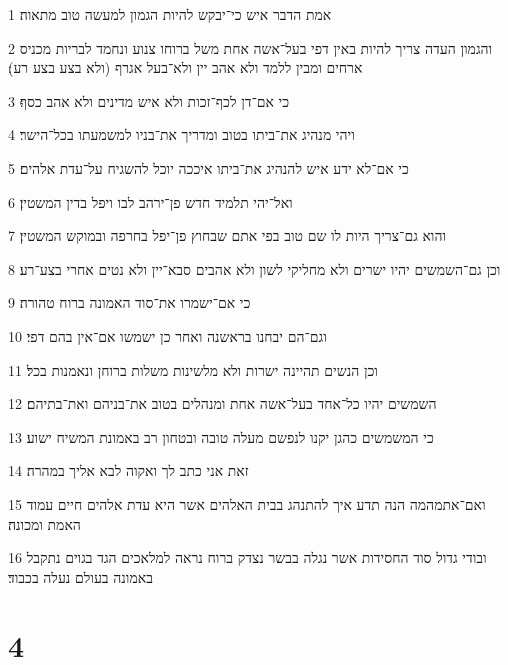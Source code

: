 \par 1 אמת הדבר איש כי־יבקש להיות הגמון למעשה טוב מתאוה׃
\par 2 והגמון העדה צריך להיות באין דפי בעל־אשה אחת משל ברוחו צנוע ונחמד לבריות מכניס ארחים ומבין ללמד ולא אהב יין ולא־בעל אגרף (ולא בצע בצע רע)׃
\par 3 כי אם־דן לכף־זכות ולא איש מדינים ולא אהב כסף׃
\par 4 ויהי מנהיג את־ביתו בטוב ומדריך את־בניו למשמעתו בכל־הישר׃
\par 5 כי אם־לא ידע איש להנהיג את־ביתו איככה יוכל להשגיח על־עדת אלהים׃
\par 6 ואל־יהי תלמיד חדש פן־ירהב לבו ויפל בדין המשטין׃
\par 7 והוא גם־צריך היות לו שם טוב בפי אתם שבחוץ פן־יפל בחרפה ובמוקש המשטין׃
\par 8 וכן גם־השמשים יהיו ישרים ולא מחליקי לשון ולא אהבים סבא־יין ולא נטים אחרי בצע־רע׃
\par 9 כי אם־ישמרו את־סוד האמונה ברוח טהורה׃
\par 10 וגם־הם יבחנו בראשנה ואחר כן ישמשו אם־אין בהם דפי׃
\par 11 וכן הנשים תהיינה ישרות ולא מלשינות משלות ברוחן ונאמנות בכל׃
\par 12 השמשים יהיו כל־אחד בעל־אשה אחת ומנהלים בטוב את־בניהם ואת־בתיהם׃
\par 13 כי המשמשים כהגן יקנו לנפשם מעלה טובה ובטחון רב באמונת המשיח ישוע׃
\par 14 זאת אני כתב לך ואקוה לבא אליך במהרה׃
\par 15 ואם־אתמהמה הנה תדע איך להתנהג בבית האלהים אשר היא עדת אלהים חיים עמוד האמת ומכונה׃
\par 16 ובודי גדול סוד החסידות אשר נגלה בבשר נצדק ברוח נראה למלאכים הגד בגוים נתקבל באמונה בעולם נעלה בכבוד׃

\chapter{4}

